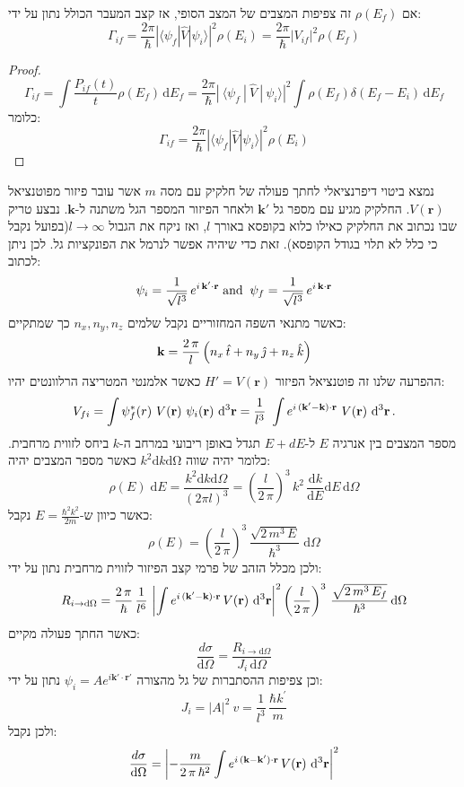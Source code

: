 \documentclass{tstextbook}
\begin{document}
\begin{proposition}
אם \(\rho(E_{f})\) זה צפיפות המצבים של המצב הסופי, אז קצב המעבר הכולל נתון על ידי:
$$\Gamma_{i f}=\frac{2\pi}{\hbar}\left|\langle \psi_{f}|\hat{V}|\psi_{i} \rangle\right|^{2}\rho(E_{i})=\frac{2\pi}{\hbar}\lvert V_{if} \rvert ^{2}\rho(E_{f})$$

\end{proposition}
\begin{proof}
$$\Gamma_{i f}=\int{\frac{P_{i f}(t)}{t}}\rho(E_{f})\,\mathrm{d}E_{f}={\frac{2\pi}{\hbar}}|\ \langle\psi_{f}\ |\ \hat{V}\ |\ \psi_{i}\rangle|^{2}\int\rho(E_{f})\delta(E_{f}-E_{i})\,\mathrm{d}E_{f}$$
כלומר:
$$\Gamma_{i f}=\frac{2\pi}{\hbar}\left|\langle\psi_{f}|\hat{V}|\psi_{i}\rangle\right|^{2}\rho(E_{i})$$

\end{proof}
\begin{example}
נמצא ביטוי דיפרנציאלי לחתך פעולה של חלקיק עם מסה \(m\) אשר עובר פיזור מפוטנציאל \(V\left( \mathbf{r} \right)\). החלקיק מגיע עם מספר גל \(\mathbf{k'}\) ולאחר הפיזור המספר הגל משתנה ל-\(\mathbf{k}\). נבצע טריק שבו נכתוב את החלקיק כאילו כלוא בקופסא באורך \(l\), ואז ניקח את הגבול \(l\to \infty\)(בפועל נקבל כי כלל לא תלוי בגודל הקופסא). זאת כדי שיהיה אפשר לנרמל את הפונקציות גל. לכן ניתן לכתוב:
$$\psi_{i}=\frac{1}{\sqrt{l^{3}}}\,e^{i\,{\bf k^{\prime}\cdot r}}\;\mathrm{and}\;\;\psi_{f}=\frac{1}{\sqrt{l^{3}}}\,e^{i\,{\bf k\cdot r}}$$
כאשר מתנאי השפה המחזוריים נקבל שלמים \(n_{x},n_{y},n_{z}\) כך שמתקיים:
$${\bf k}=\frac{2\,\pi}{l}\left(n_{x}\,\hat{t}+n_{y}\,\hat{\jmath}+n_{z}\,\hat{k}\right)$$
ההפרעה שלנו זה פוטנציאל הפיזור \(H'=V\left( \mathbf{r} \right)\) כאשר אלמנטי המטריצה הרלוונטים יהיו:
$$V_{f i}=\int\psi_{f}^{*}(r)\ V({\bf r})\ \psi_{i}({\bf r})\ \mathrm{d}^{3}{\bf r}=\frac{1}{l^{3}}\ \int e^{i\,({\bf k^{\prime}-k})\cdot{\bf r}}\ V({\bf r})\ \mathrm{d}^{3}{\bf r}\,.$$
מספר המצבים בין אנרגיה \(E\) ל-\(E+dE\) תגדל באופן ריבועי במרחב ה-\(k\) ביחס לזווית מרחבית. כלומר יהיה שווה \(k^{2}\mathrm{d}k\mathrm{\mathrm{d}\Omega}\) כאשר מספר המצבים יהיה:
$$\rho(E)\;\mathrm{d} E={\frac{k^{2}\mathrm{d} k\mathrm{d}\Omega}{\left(2\pi l\right)^{3}}}=\left({\frac{l}{2\,\pi}}\right)^{3}\,k^{2}\,{\frac{\mathrm{d} k}{\mathrm{d} E}}\mathrm{d} E\,\mathrm{d}\Omega$$
כאשר כיוון ש-\(E=\frac{\hbar^{2}k^{2}}{2m}\) נקבל:
$$\rho(E)=\left(\frac{l}{2\,\pi}\right)^{3}\,\frac{\sqrt{2\,m^{3}\,E}}{\hbar^{3}}\;\mathrm{d}\Omega$$
ולכן מכלל הזהב של פרמי קצב הפיזור לזווית מרחבית נתון על ידי:
$$R_{i\to \mathrm{d}\Omega}=\frac{2\,\pi}{\hbar}\,\frac{1}{l^{6}}\,\left|\int e^{i\,({\bf k^{\prime}-k})\cdot{\bf r}}\,V({\bf r})\ \mathrm{d}^{3}{\bf r}\right|^{2}\left(\frac{l}{2\,\pi}\right)^{3}\,\frac{\sqrt{2\,m^{3}\,E_{f}}}{\hbar^{3}}\,\mathrm{d}\Omega$$
כאשר החתך פעולה מקיים:
$$\frac{d\sigma}{\mathrm{d}\Omega}=\frac{R_{i\to \mathrm{d}\Omega}}{J_{i}\,\mathrm{d}\Omega}$$
וכן צפיפות ההסתברות של גל מהצורה \(\psi_{i}=Ae^{ i\mathbf{k'\cdot r'} }\) נתון על ידי:
$$J_{i}=|A|^{2}\ v=\frac{1}{l^{3}}\,\frac{\hbar k^{\prime}}{m}$$
ולכן נקבל:
$$\frac{d\sigma}{\mathrm{d}\Omega}=\left|-\frac{m}{2\,\pi\,\hbar^{2}}\int e^{i\,({\bf k}-{\bf k}^{\prime})\cdot{\bf r}}\,V({\bf r})\,\,\mathrm{d}^{3}{\bf r}\right|^{2}$$

\end{example}
\end{document}

